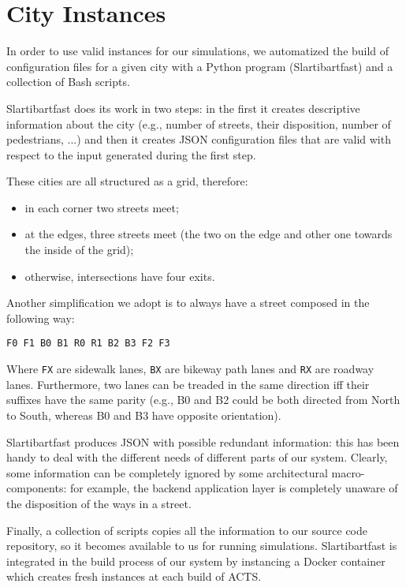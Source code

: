 \section{City Instances}

In order to use valid instances for our simulations, we automatized the build
of configuration files for a given city with a Python program (Slartibartfast)
and a collection of Bash scripts.

Slartibartfast does its work in two steps: in the first it creates
descriptive information about the city (e.g., number of streets, their
disposition, number of pedestrians, ...) and then it creates JSON configuration
files that are valid with respect to the input generated during the first step.

These cities are all structured as a grid, therefore:

\begin{itemize}
    \item in each corner two streets meet;
    \item at the edges, three streets meet (the two on the edge and other one
        towards the inside of the grid);
    \item otherwise, intersections have four exits.
\end{itemize}

Another simplification we adopt is to always have a street composed in the
following way:

\begin{verbatim}
F0 F1 B0 B1 R0 R1 B2 B3 F2 F3
\end{verbatim}

Where \texttt{FX} are sidewalk lanes, \texttt{BX} are bikeway path lanes and
\texttt{RX} are roadway lanes. Furthermore, two lanes can be treaded in the
same direction iff their suffixes have the same parity (e.g., B0 and B2
could be both directed from North to South, whereas B0 and B3 have opposite
orientation).

Slartibartfast produces JSON with possible redundant information: this has
been handy to deal with the different needs of different parts of our system.
Clearly, some information can be completely ignored by some architectural
macro-components: for example, the backend application layer is completely
unaware of the disposition of the ways in a street.

Finally, a collection of scripts copies all the information to our source code
repository, so it becomes available to us for running simulations.
Slartibartfast is integrated in the build process of our system by instancing
a Docker container which creates fresh instances at each build of ACTS.
